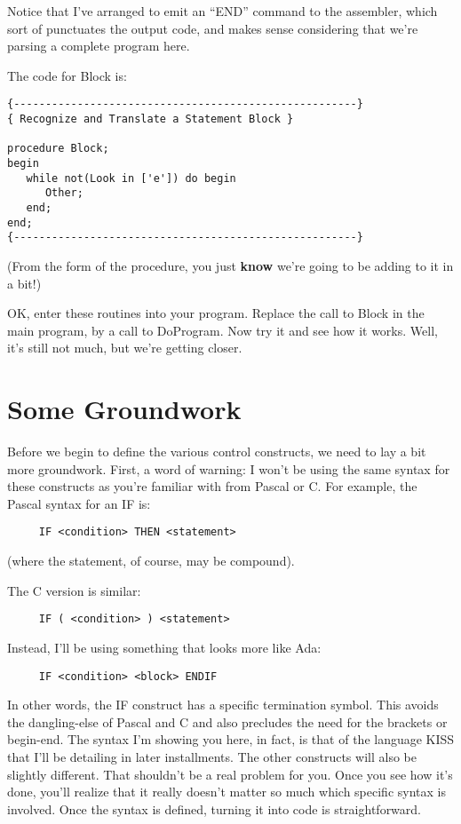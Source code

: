 Notice  that  I've  arranged to emit  an  ``END''  command  to  the assembler, which sort of  punctuates  the  output code, and makes sense considering that we're parsing a complete program here.

The code for Block is:

\begin{verbatim}
{------------------------------------------------------}
{ Recognize and Translate a Statement Block }

procedure Block;
begin
   while not(Look in ['e']) do begin
      Other;
   end;
end;
{------------------------------------------------------}
\end{verbatim}

(From the form of the procedure, you just {\bfseries know} we're going  to be adding to it in a bit!)

OK, enter these routines into your program. Replace the  call to Block in the main program, by  a  call  to DoProgram. Now try it and  see  how  it works. Well, it's still not  much, but  we're getting closer.

\section{Some Groundwork}

Before we begin to define the various control constructs, we need to  lay a bit more groundwork. First, a word of warning: I won't be using the same syntax  for these constructs as you're familiar with  from Pascal or C. For example, the Pascal syntax for an IF is:

\begin{verbatim}
     IF <condition> THEN <statement>
\end{verbatim}

(where the statement, of course, may be compound).

The C version is similar:

\begin{verbatim}
     IF ( <condition> ) <statement>
\end{verbatim}

Instead, I'll be using something that looks more like Ada:

\begin{verbatim}
     IF <condition> <block> ENDIF
\end{verbatim}

In  other  words, the IF construct has  a  specific  termination symbol. This avoids  the  dangling-else of Pascal and C and also precludes the need for the brackets {} or begin-end. The syntax I'm showing you here, in fact, is that of the language  KISS that I'll be detailing in  later  installments. The other constructs will also be  slightly  different. That  shouldn't  be  a real problem for you. Once you see how it's done, you'll realize that it  really  doesn't  matter  so  much  which  specific syntax  is involved. Once the syntax is defined, turning it  into  code  is straightforward.

